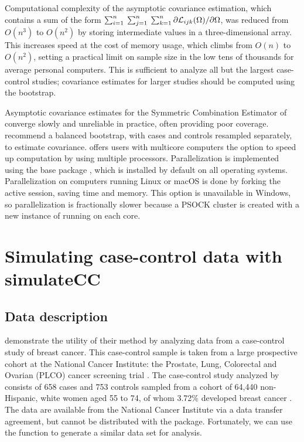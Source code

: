\documentclass[nojss]{jss}
\begin{document}
Computational complexity of the asymptotic covariance estimation, which
contains a sum of the form
\(\sum_{i=1}^{n} \: \sum_{j=1}^{n} \: \sum_{k=1}^{n} \partial {\cal L}_{ijk}(\Omega) / \partial \Omega\),
was reduced from \(O(n^3)\) to \(O(n^2)\) by storing intermediate values
in a three-dimensional array. This increases speed at the cost of memory
usage, which climbs from \(O(n)\) to \(O(n^2)\), setting a practical
limit on sample size in the low tens of thousands for average personal
computers. This is sufficient to analyze all but the largest
case-control studies; covariance estimates for larger studies should be
computed using the bootstrap.

Asymptotic covariance estimates for the Symmetric Combination Estimator
of \citeauthor{Wang2018unpublished} converge slowly and unreliable in
practice, often providing poor coverage.
\citeauthor{Wang2018unpublished} recommend a balanced bootstrap, with
cases and controls resampled separately, to estimate covariance.
 offers users with multicore computers the option to
speed up computation by using multiple processors. Parallelization is
implemented using the  base package , which is
installed by default on all operating systems. Parallelization on
computers running Linux or macOS is done by forking the active
 session, saving time and memory. This option is unavailable
in Windows, so parallelization is fractionally slower because a PSOCK
cluster is created with a new instance of  running on each
core.

\section{Simulating case-control data with simulateCC} \label{sec:simulateCC}

\subsection{Data description}

\cite{Wang2018unpublished} demonstrate the utility of their method by
analyzing data from a case-control study of breast cancer. This
case-control sample is taken from a large prospective cohort at the
National Cancer Institute: the Prostate, Lung, Colorectal and Ovarian
(PLCO) cancer screening trial \citep{canzian2010comprehensive}. The
case-control study analyzed by \citeauthor{Wang2018unpublished} consists
of 658 cases and 753 controls sampled from a cohort of 64,440
non-Hispanic, white women aged 55 to 74, of whom 3.72\% developed breast
cancer \citep{pfeiffer2013risk}. The data are available from the
National Cancer Institute via a data transfer agreement, but cannot be
distributed with the  package. Fortunately, we can
use the  function  to generate a
similar data set for analysis.
\end{document}
